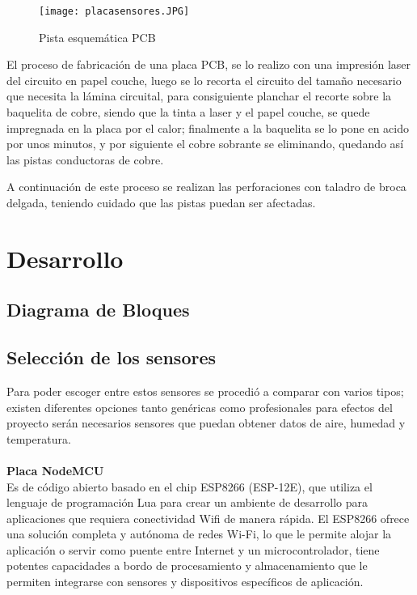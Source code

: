 \documentclass[10pt,a4paper]{article}
\begin{document}
\begin{figure}[H]
\centering
 \texttt{[image: placasensores.JPG]} 
\caption{Pista esquemática PCB} 
\end{figure}

El proceso de fabricación de una placa PCB, se lo realizo con una impresión laser del circuito en papel couche, luego se lo recorta el circuito del tamaño necesario que necesita la lámina circuital, para consiguiente planchar el recorte sobre la baquelita de cobre, siendo que la tinta a laser y el papel couche, se quede impregnada en la placa por el calor; finalmente a la baquelita se lo pone en acido por unos minutos, y por siguiente el cobre sobrante se eliminando, quedando así las pistas conductoras de cobre. 


A continuación de este proceso se realizan las perforaciones con taladro de broca delgada, teniendo cuidado que las pistas puedan ser afectadas.\\


\section{Desarrollo}

\subsection{Diagrama de Bloques}


\begin{center}
\end{center}


\subsection{Selección de los sensores}

Para poder escoger entre estos sensores se procedió a comparar con varios tipos; existen diferentes opciones tanto genéricas como profesionales para efectos del proyecto serán necesarios sensores que puedan obtener datos de aire, humedad y temperatura.\\\\

\textbf{Placa NodeMCU}\\

Es de código abierto basado en el chip ESP8266 (ESP-12E), que utiliza el lenguaje de programación Lua para crear un ambiente de desarrollo para aplicaciones que requiera conectividad Wifi de manera rápida.
El ESP8266 ofrece una solución completa y autónoma de redes Wi-Fi, lo que le permite alojar la aplicación o servir como puente entre Internet y un microcontrolador, tiene potentes capacidades a bordo de procesamiento y almacenamiento que le permiten integrarse con sensores y dispositivos específicos de aplicación.\\\\
\end{document}
